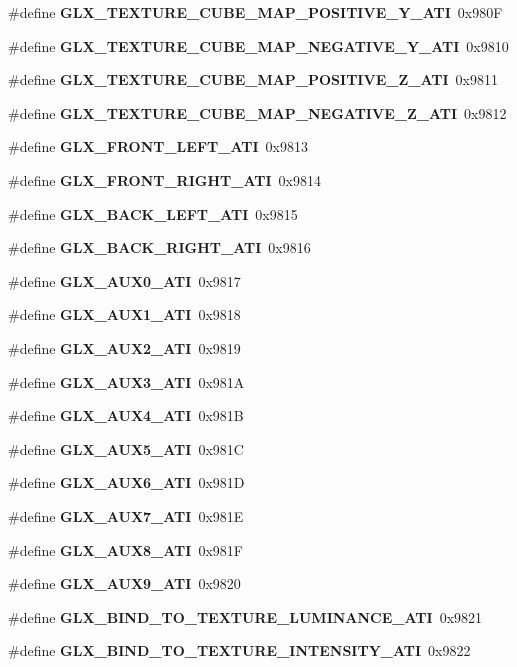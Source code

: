 \begin{DoxyCompactItemize}
\item 
\#define {\bf G\+L\+X\+\_\+\+T\+E\+X\+T\+U\+R\+E\+\_\+\+C\+U\+B\+E\+\_\+\+M\+A\+P\+\_\+\+P\+O\+S\+I\+T\+I\+V\+E\+\_\+\+Y\+\_\+\+A\+TI}~0x980F
\item 
\#define {\bf G\+L\+X\+\_\+\+T\+E\+X\+T\+U\+R\+E\+\_\+\+C\+U\+B\+E\+\_\+\+M\+A\+P\+\_\+\+N\+E\+G\+A\+T\+I\+V\+E\+\_\+\+Y\+\_\+\+A\+TI}~0x9810
\item 
\#define {\bf G\+L\+X\+\_\+\+T\+E\+X\+T\+U\+R\+E\+\_\+\+C\+U\+B\+E\+\_\+\+M\+A\+P\+\_\+\+P\+O\+S\+I\+T\+I\+V\+E\+\_\+\+Z\+\_\+\+A\+TI}~0x9811
\item 
\#define {\bf G\+L\+X\+\_\+\+T\+E\+X\+T\+U\+R\+E\+\_\+\+C\+U\+B\+E\+\_\+\+M\+A\+P\+\_\+\+N\+E\+G\+A\+T\+I\+V\+E\+\_\+\+Z\+\_\+\+A\+TI}~0x9812
\item 
\#define {\bf G\+L\+X\+\_\+\+F\+R\+O\+N\+T\+\_\+\+L\+E\+F\+T\+\_\+\+A\+TI}~0x9813
\item 
\#define {\bf G\+L\+X\+\_\+\+F\+R\+O\+N\+T\+\_\+\+R\+I\+G\+H\+T\+\_\+\+A\+TI}~0x9814
\item 
\#define {\bf G\+L\+X\+\_\+\+B\+A\+C\+K\+\_\+\+L\+E\+F\+T\+\_\+\+A\+TI}~0x9815
\item 
\#define {\bf G\+L\+X\+\_\+\+B\+A\+C\+K\+\_\+\+R\+I\+G\+H\+T\+\_\+\+A\+TI}~0x9816
\item 
\#define {\bf G\+L\+X\+\_\+\+A\+U\+X0\+\_\+\+A\+TI}~0x9817
\item 
\#define {\bf G\+L\+X\+\_\+\+A\+U\+X1\+\_\+\+A\+TI}~0x9818
\item 
\#define {\bf G\+L\+X\+\_\+\+A\+U\+X2\+\_\+\+A\+TI}~0x9819
\item 
\#define {\bf G\+L\+X\+\_\+\+A\+U\+X3\+\_\+\+A\+TI}~0x981A
\item 
\#define {\bf G\+L\+X\+\_\+\+A\+U\+X4\+\_\+\+A\+TI}~0x981B
\item 
\#define {\bf G\+L\+X\+\_\+\+A\+U\+X5\+\_\+\+A\+TI}~0x981C
\item 
\#define {\bf G\+L\+X\+\_\+\+A\+U\+X6\+\_\+\+A\+TI}~0x981D
\item 
\#define {\bf G\+L\+X\+\_\+\+A\+U\+X7\+\_\+\+A\+TI}~0x981E
\item 
\#define {\bf G\+L\+X\+\_\+\+A\+U\+X8\+\_\+\+A\+TI}~0x981F
\item 
\#define {\bf G\+L\+X\+\_\+\+A\+U\+X9\+\_\+\+A\+TI}~0x9820
\item 
\#define {\bf G\+L\+X\+\_\+\+B\+I\+N\+D\+\_\+\+T\+O\+\_\+\+T\+E\+X\+T\+U\+R\+E\+\_\+\+L\+U\+M\+I\+N\+A\+N\+C\+E\+\_\+\+A\+TI}~0x9821
\item 
\#define {\bf G\+L\+X\+\_\+\+B\+I\+N\+D\+\_\+\+T\+O\+\_\+\+T\+E\+X\+T\+U\+R\+E\+\_\+\+I\+N\+T\+E\+N\+S\+I\+T\+Y\+\_\+\+A\+TI}~0x9822

\end{DoxyCompactItemize}
